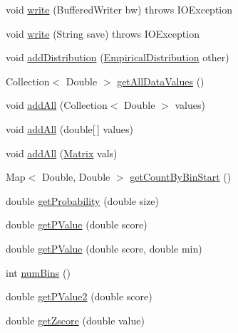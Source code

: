 \begin{DoxyCompactItemize}
\item 
void \hyperlink{classbroad_1_1core_1_1math_1_1_empirical_distribution_a68ae43d0986450ccce8a24b921240841}{write} (Buffered\+Writer bw)  throws I\+O\+Exception 
\item 
void \hyperlink{classbroad_1_1core_1_1math_1_1_empirical_distribution_a52631cf27bd4ad09d9459c87ca0c1858}{write} (String save)  throws I\+O\+Exception 
\item 
void \hyperlink{classbroad_1_1core_1_1math_1_1_empirical_distribution_ab30ba86cb58af59b4e0b69d80ac7c065}{add\+Distribution} (\hyperlink{classbroad_1_1core_1_1math_1_1_empirical_distribution}{Empirical\+Distribution} other)
\item 
Collection$<$ Double $>$ \hyperlink{classbroad_1_1core_1_1math_1_1_empirical_distribution_a87b93a0a097bfd7fa7b330b77075108e}{get\+All\+Data\+Values} ()
\item 
void \hyperlink{classbroad_1_1core_1_1math_1_1_empirical_distribution_a4d05360a7bcfac8d5011cf41c10d5aa7}{add\+All} (Collection$<$ Double $>$ values)
\item 
void \hyperlink{classbroad_1_1core_1_1math_1_1_empirical_distribution_a6d13873bfbfef63a08a29c488e08729c}{add\+All} (double\mbox{[}$\,$\mbox{]} values)
\item 
void \hyperlink{classbroad_1_1core_1_1math_1_1_empirical_distribution_aafd28ccece052bd225908af2891de0ae}{add\+All} (\hyperlink{class_jama_1_1_matrix}{Matrix} vals)
\item 
Map$<$ Double, Double $>$ \hyperlink{classbroad_1_1core_1_1math_1_1_empirical_distribution_abf937e871a1bfd38d2cfb30cb2641d68}{get\+Count\+By\+Bin\+Start} ()
\item 
double \hyperlink{classbroad_1_1core_1_1math_1_1_empirical_distribution_a8ebca08775010dcd36c0d4dacd19fb90}{get\+Probability} (double size)
\item 
double \hyperlink{classbroad_1_1core_1_1math_1_1_empirical_distribution_a4fe6ff857ebe0d3a9b3b1a132f8f0003}{get\+P\+Value} (double score)
\item 
double \hyperlink{classbroad_1_1core_1_1math_1_1_empirical_distribution_aa1dd79188cb064afb274fb0b16d4dac4}{get\+P\+Value} (double score, double min)
\item 
int \hyperlink{classbroad_1_1core_1_1math_1_1_empirical_distribution_aa0e75954ec367fc3b7882d884100a652}{num\+Bins} ()
\item 
double \hyperlink{classbroad_1_1core_1_1math_1_1_empirical_distribution_ae214d3d72550b348d271bae4e790ab0c}{get\+P\+Value2} (double score)
\item 
double \hyperlink{classbroad_1_1core_1_1math_1_1_empirical_distribution_a2ae5c95e4aca00cffcc7fae6031a165b}{get\+Zscore} (double value)
\end{DoxyCompactItemize}
